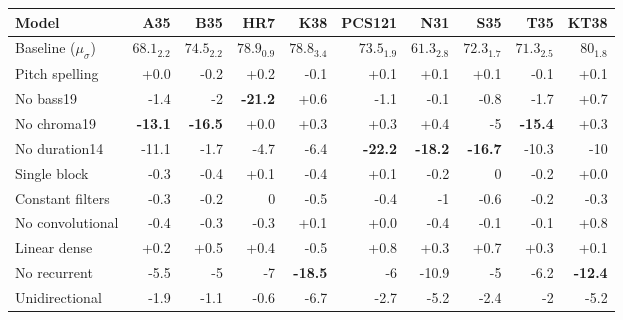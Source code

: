\begin{tabular}{l|rrrrrrrrr}
Model               & A35            & B35            & HR7            & K38            & PCS121         & N31            & S35            & T35            & KT38           \\ \hline
Baseline ($\mu_\sigma$)     & $68.1_{2.2}$          & $74.5_{2.2}$           & $78.9_{0.9}$           & $78.8_{3.4}$           & $73.5_{1.9}$           & $61.3_{2.8}$           & $72.3_{1.7}$           & $71.3_{2.5}$           & $80_{1.8}$             \\ \hline
Pitch spelling      & +0.0           & -0.2           & +0.2           & -0.1           & +0.1           & +0.1           & +0.1           & -0.1           & +0.1           \\
No \gls{bass19}     & -1.4           & -2             & \textbf{-21.2} & +0.6           & -1.1           & -0.1           & -0.8           & -1.7           & +0.7           \\
No \gls{chroma19}   & \textbf{-13.1} & \textbf{-16.5} & +0.0           & +0.3           & +0.3           & +0.4           & -5             & \textbf{-15.4} & +0.3           \\
No \gls{duration14} & -11.1          & -1.7           & -4.7           & -6.4           & \textbf{-22.2} & \textbf{-18.2} & \textbf{-16.7} & -10.3          & -10            \\
Single block        & -0.3           & -0.4           & +0.1           & -0.4           & +0.1           & -0.2           & 0              & -0.2           & +0.0           \\
Constant filters    & -0.3           & -0.2           & 0              & -0.5           & -0.4           & -1             & -0.6           & -0.2           & -0.3           \\
No convolutional    & -0.4           & -0.3           & -0.3           & +0.1           & +0.0           & -0.4           & -0.1           & -0.1           & +0.8           \\
Linear dense        & +0.2           & +0.5           & +0.4           & -0.5           & +0.8           & +0.3           & +0.7           & +0.3           & +0.1           \\
No recurrent        & -5.5           & -5             & -7             & \textbf{-18.5} & -6             & -10.9          & -5             & -6.2           & \textbf{-12.4} \\
Unidirectional      & -1.9           & -1.1           & -0.6           & -6.7           & -2.7           & -5.2           & -2.4           & -2             & -5.2          
\end{tabular}

